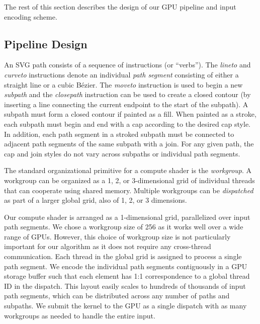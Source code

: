 \documentclass[sigconf, nonacm]{acmart}
\begin{document}
The rest of this section describes the design of our GPU pipeline and input encoding scheme.

\subsection{Pipeline Design} \label{subsec:pipeline-design}

An SVG path consists of a sequence of instructions (or ``verbs''). The \emph{lineto} and \emph{curveto} instructions denote an individual \emph{path segment} consisting of either a straight line or a cubic Bézier. The \emph{moveto} instruction is used to begin a new \emph{subpath} and the \emph{closepath} instruction can be used to create a closed contour (by inserting a line connecting the current endpoint to the start of the subpath). A subpath must form a closed contour if painted as a fill. When painted as a stroke, each subpath must begin and end with a cap according to the desired cap style. In addition, each path segment in a stroked subpath must be connected to adjacent path segments of the same subpath with a join. For any given path, the cap and join styles do not vary across subpaths or individual path segments.

The standard organizational primitive for a compute shader is the \emph{workgroup}. A workgroup can be organized as a 1, 2, or 3-dimensional grid of individual threads that can cooperate using shared memory. Multiple workgroups can be \emph{dispatched} as part of a larger global grid, also of 1, 2, or 3 dimensions.

Our compute shader is arranged as a 1-dimensional grid, parallelized over input path segments. We chose a workgroup size of 256 as it works well over a wide range of GPUs. However, this choice of workgroup size is not particularly important for our algorithm as it does not require any cross-thread communication. Each thread in the global grid is assigned to process a single path segment. We encode the individual path segments contiguously in a GPU storage buffer such that each element has 1:1 correspondence to a global thread ID in the dispatch. This layout easily scales to hundreds of thousands of input path segments, which can be distributed across any number of paths and subpaths. We submit the kernel to the GPU as a single dispatch with as many workgroups as needed to handle the entire input.
\end{document}

